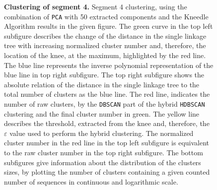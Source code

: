 \begin{figure}[!hbt]
\begin{subfigure}[b]{0.475\textwidth}
    \end{subfigure}
    \caption[Clustering of segment 4]{\textbf{Clustering of segment 4.} Segment 4 clustering, using the combination of \texttt{PCA} with 50 extracted components and the Kneedle Algorithm results in the given figure. The green curve in the top left subfigure describes the change of the distance in the single linkage tree with increasing normalized cluster number and, therefore, the location of the knee, at the maximum, highlighted by the red line. The blue line represents the inverse polynomial representation of the blue line in top right subfigure. The top right subfigure shows the absolute relation of the distance in the single linkage tree to the total number of clusters as the blue line. The red line, indicates the number of raw clusters, by the \texttt{DBSCAN} part of the hybrid \texttt{HDBSCAN} clustering and the final cluster number in green. The yellow line describes the threshold, extracted from the knee and, therefore, the $\varepsilon$ value used to perform the hybrid clustering. The normalized cluster number in the red line in the top left subfigure is equivalent to the raw cluster number in the top right subfigure. The bottom subfigures give information about the distribution of the clusters sizes, by plotting the number of clusters containing a given counted number of sequences in continuous and logarithmic scale.}
    \label{fig:Result_Cluster_Knee_4}
\end{figure}




